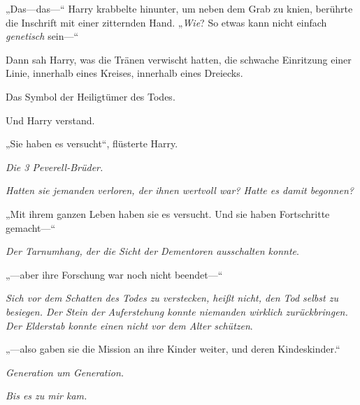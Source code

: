„Das—das—“ Harry krabbelte hinunter, um neben dem Grab zu knien, berührte die Inschrift mit einer zitternden Hand. „\emph{Wie}? So etwas kann nicht einfach \emph{genetisch} sein—“

Dann sah Harry, was die Tränen verwischt hatten, die schwache Einritzung einer Linie, innerhalb eines Kreises, innerhalb eines Dreiecks.

Das Symbol der Heiligtümer des Todes.

Und Harry verstand.

„Sie haben es versucht“, flüsterte Harry.

\emph{Die 3 Peverell-Brüder.}

\emph{Hatten sie jemanden verloren, der ihnen wertvoll war? Hatte es damit begonnen?}

„Mit ihrem ganzen Leben haben sie es versucht. Und sie haben Fortschritte gemacht—“

\emph{Der Tarnumhang, der die Sicht der Dementoren ausschalten konnte}.

 „—aber ihre Forschung war noch nicht beendet—“

\emph{Sich vor dem Schatten des Todes zu verstecken, heißt nicht, den Tod selbst zu besiegen. Der Stein der Auferstehung konnte niemanden wirklich zurückbringen. Der Elderstab konnte einen nicht vor dem Alter schützen}.

„—also gaben sie die Mission an ihre Kinder weiter, und deren Kindeskinder.“

\emph{Generation um Generation.}

\emph{Bis es zu mir kam.}

